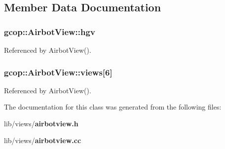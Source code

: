 \subsection{\-Member \-Data \-Documentation}
\subsubsection[{hgv}]{ {\bf gcop\-::\-Airbot\-View\-::hgv}}\label{classgcop_1_1AirbotView_af4824f295a0e131b6386a51d17c1c5a6}


\-Referenced by \-Airbot\-View().

\subsubsection[{views}]{ {\bf gcop\-::\-Airbot\-View\-::views}[6]}\label{classgcop_1_1AirbotView_a84bfdb3e5888cff15dbb2d54d6e14aa4}


\-Referenced by \-Airbot\-View().



\-The documentation for this class was generated from the following files\-:\begin{DoxyCompactItemize}
\item 
lib/views/{\bf airbotview.\-h}\item 
lib/views/{\bf airbotview.\-cc}\end{DoxyCompactItemize}

